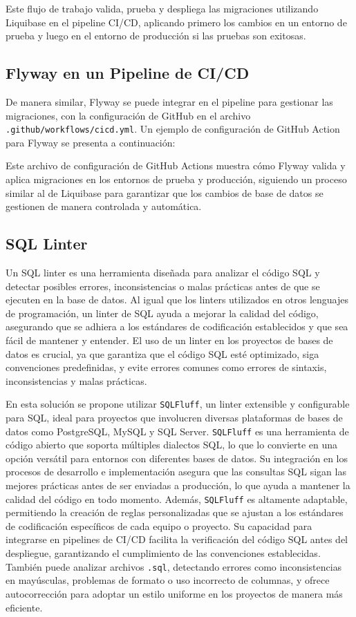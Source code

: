 \documentclass{IEEEtran}
\begin{document}
Este flujo de trabajo valida, prueba y despliega las migraciones utilizando Liquibase en el pipeline CI/CD, aplicando primero los cambios en un entorno de prueba y luego en el entorno de producción si las pruebas son exitosas.

\subsection{Flyway en un Pipeline de CI/CD}
De manera similar, Flyway se puede integrar en el pipeline para gestionar las migraciones, con la configuración de GitHub en el archivo \texttt{.github/workflows/cicd.yml}. Un ejemplo de configuración de GitHub Action para Flyway se presenta a continuación:


Este archivo de configuración de GitHub Actions muestra cómo Flyway valida y aplica migraciones en los entornos de prueba y producción, siguiendo un proceso similar al de Liquibase para garantizar que los cambios de base de datos se gestionen de manera controlada y automática.

\subsection{SQL Linter}
Un SQL linter es una herramienta diseñada para analizar el código SQL y detectar posibles errores, inconsistencias o malas prácticas antes de que se ejecuten en la base de datos. Al igual que los linters utilizados en otros lenguajes de programación, un linter de SQL ayuda a mejorar la calidad del código, asegurando que se adhiera a los estándares de codificación establecidos y que sea fácil de mantener y entender. El uso de un linter en los proyectos de bases de datos es crucial, ya que garantiza que el código SQL esté optimizado, siga convenciones predefinidas, y evite errores comunes como errores de sintaxis, inconsistencias y malas prácticas.

En esta solución se propone utilizar \texttt{SQLFluff}, un linter extensible y configurable para SQL, ideal para proyectos que involucren diversas plataformas de bases de datos como PostgreSQL, MySQL y SQL Server. \texttt{SQLFluff} es una herramienta de código abierto que soporta múltiples dialectos SQL, lo que lo convierte en una opción versátil para entornos con diferentes bases de datos. Su integración en los procesos de desarrollo e implementación asegura que las consultas SQL sigan las mejores prácticas antes de ser enviadas a producción, lo que ayuda a mantener la calidad del código en todo momento. Además, \texttt{SQLFluff} es altamente adaptable, permitiendo la creación de reglas personalizadas que se ajustan a los estándares de codificación específicos de cada equipo o proyecto. Su capacidad para integrarse en pipelines de CI/CD facilita la verificación del código SQL antes del despliegue, garantizando el cumplimiento de las convenciones establecidas. También puede analizar archivos \texttt{.sql}, detectando errores como inconsistencias en mayúsculas, problemas de formato o uso incorrecto de columnas, y ofrece autocorrección para adoptar un estilo uniforme en los proyectos de manera más eficiente.
\end{document}
